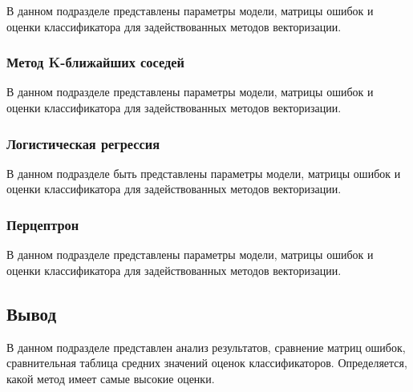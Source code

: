 В данном подразделе представлены параметры модели, матрицы ошибок и оценки классификатора для задействованных методов векторизации.


\subsubsection{Метод K-ближайших соседей }

В данном подразделе представлены параметры модели, матрицы ошибок и оценки классификатора для задействованных методов векторизации.



\subsubsection{Логистическая регрессия}

В данном подразделе быть представлены параметры модели, матрицы ошибок и оценки классификатора для задействованных методов векторизации.



\subsubsection{Перцептрон}

В данном подразделе представлены параметры модели, матрицы ошибок и оценки классификатора для задействованных методов векторизации.

\subsection*{Вывод}

В данном подразделе представлен анализ результатов, сравнение матриц ошибок, сравнительная таблица средних значений оценок классификаторов. Определяется, какой метод имеет самые высокие оценки.
